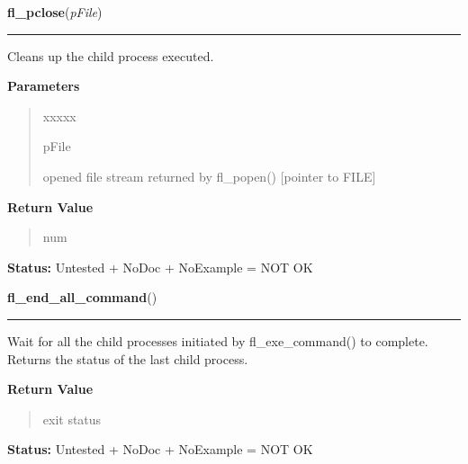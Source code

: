 \hspace{.8\funcindent}\begin{boxedminipage}{\funcwidth}

    \raggedright \textbf{fl\_pclose}(\textit{pFile})

    \vspace{-1.5ex}

    \rule{\textwidth}{0.5\fboxrule}
\setlength{\parskip}{2ex}
    Cleans up the child process executed.

\setlength{\parskip}{1ex}
      \textbf{Parameters}
      \vspace{-1ex}

      \begin{quote}
        \begin{Ventry}{xxxxx}

          \item[pFile]

          opened file stream returned by fl\_popen() [pointer to FILE]

        \end{Ventry}

      \end{quote}

      \textbf{Return Value}
    \vspace{-1ex}

      \begin{quote}
      num

      \end{quote}

\textbf{Status:} Untested + NoDoc + NoExample = NOT OK



    \end{boxedminipage}

    \label{xformslib:library:fl_end_all_command}

    \vspace{0.5ex}

\hspace{.8\funcindent}\begin{boxedminipage}{\funcwidth}

    \raggedright \textbf{fl\_end\_all\_command}()

    \vspace{-1.5ex}

    \rule{\textwidth}{0.5\fboxrule}
\setlength{\parskip}{2ex}
    Wait for all the child processes initiated by fl\_exe\_command() to 
    complete. Returns the status of the last child process.

\setlength{\parskip}{1ex}
      \textbf{Return Value}
    \vspace{-1ex}

      \begin{quote}
      exit status

      \end{quote}

\textbf{Status:} Untested + NoDoc + NoExample = NOT OK



    \end{boxedminipage}

